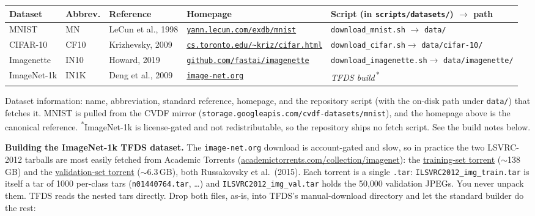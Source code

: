 \begin{center}
\footnotesize\setlength{\tabcolsep}{4pt}
\begin{tabular}{@{}l l l p{4.3cm} p{4.0cm}@{}}
\hline
Dataset & Abbrev. & Reference & Homepage & Script (in \texttt{scripts/datasets/}) $\to$ path \\
\hline
MNIST & MN & LeCun et al., 1998 &
  \href{http://yann.lecun.com/exdb/mnist/}{\nolinkurl{yann.lecun.com/exdb/mnist}} &
  \texttt{download\_mnist.sh} $\to$ \texttt{data/} \\[2pt]
CIFAR-10 & CF10 & Krizhevsky, 2009 &
  \href{https://www.cs.toronto.edu/~kriz/cifar.html}{\nolinkurl{cs.toronto.edu/~kriz/cifar.html}} &
  \texttt{download\_cifar.sh}\newline $\to$ \texttt{data/cifar-10/} \\[2pt]
Imagenette & IN10 & Howard, 2019 &
  \href{https://github.com/fastai/imagenette}{\nolinkurl{github.com/fastai/imagenette}} &
  \texttt{download\_imagenette.sh}\newline $\to$ \texttt{data/imagenette/} \\[2pt]
ImageNet-1k & IN1K & Deng et al., 2009 &
  \href{https://www.image-net.org/}{\nolinkurl{image-net.org}} &
  \textit{TFDS build}\,\textsuperscript{*} \\
\hline
\end{tabular}
\end{center}

\noindent\small Dataset information: name, abbreviation, standard
reference, homepage, and the repository script (with the on-disk path
under \texttt{data/}) that fetches it. MNIST is pulled from the CVDF
mirror (\nolinkurl{storage.googleapis.com/cvdf-datasets/mnist}), and the
homepage above is the canonical reference.
\textsuperscript{*}ImageNet-1k is license-gated and not redistributable,
so the repository ships no fetch script. See the build notes below.
\normalsize

\medskip\noindent\textbf{Building the ImageNet-1k TFDS dataset.} The
\nolinkurl{image-net.org} download is account-gated and slow, so in
practice the two LSVRC-2012 tarballs are most easily fetched from Academic
Torrents
(\href{https://academictorrents.com/collection/imagenet}{academictorrents.com/collection/imagenet}):
the
\href{https://academictorrents.com/details/a306397ccf9c2ead27155983c254227c0fd938e2}{training-set
torrent} ($\sim$138\,GB) and the
\href{https://academictorrents.com/details/5d6d0df7ed81efd49ca99ea4737e0ae5e3a5f2e5}{validation-set
torrent} ($\sim$6.3\,GB), both Russakovsky et al.\ (2015). Each torrent is
a single \texttt{.tar}: \texttt{ILSVRC2012\_img\_train.tar} is itself a
tar of 1000 per-class tars (\texttt{n01440764.tar}, \ldots) and
\texttt{ILSVRC2012\_img\_val.tar} holds the 50{,}000 validation JPEGs.
You never unpack them. TFDS reads the nested tars directly.
Drop both files, as-is, into TFDS's manual-download directory and let the
standard builder do the rest:

